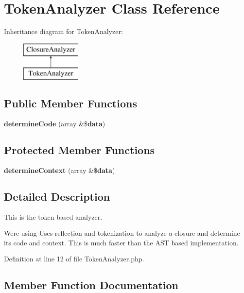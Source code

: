 \section{Token\+Analyzer Class Reference}
\label{class_super_closure_1_1_analyzer_1_1_token_analyzer}
Inheritance diagram for Token\+Analyzer\+:\begin{figure}[H]
\begin{center}
\leavevmode
\includegraphics[height=2.000000cm]{class_super_closure_1_1_analyzer_1_1_token_analyzer}
\end{center}
\end{figure}
\subsection*{Public Member Functions}
\begin{DoxyCompactItemize}
\item 
{\bf determine\+Code} (array \&\${\bf data})
\end{DoxyCompactItemize}
\subsection*{Protected Member Functions}
\begin{DoxyCompactItemize}
\item 
{\bf determine\+Context} (array \&\${\bf data})
\end{DoxyCompactItemize}


\subsection{Detailed Description}
This is the token based analyzer.

We\textquotesingle{}re using Uses reflection and tokenization to analyze a closure and determine its code and context. This is much faster than the A\+S\+T based implementation. 

Definition at line 12 of file Token\+Analyzer.\+php.



\subsection{Member Function Documentation}
